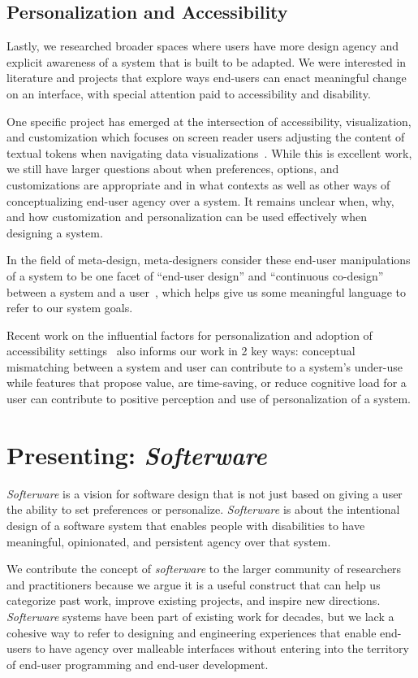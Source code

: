 \documentclass[12pt]{cmuthesis}
\begin{document}
\subsection{Personalization and Accessibility}
Lastly, we researched broader spaces where users have more design agency and explicit awareness of a system that is built to be adapted. We were interested in literature and projects that explore ways end-users can enact meaningful change on an interface, with special attention paid to accessibility and disability.

One specific project has emerged at the intersection of accessibility, visualization, and customization which focuses on screen reader users adjusting the content of textual tokens when navigating data visualizations~\cite{Jones2024}. While this is excellent work, we still have larger questions about when preferences, options, and customizations are appropriate and in what contexts as well as other ways of conceptualizing end-user agency over a system. It remains unclear when, why, and how customization and personalization can be used effectively when designing a system.

In the field of meta-design, meta-designers consider these end-user manipulations of a system to be one facet of ``end-user design'' and ``continuous co-design'' between a system and a user~\cite{Maceli2013}, which helps give us some meaningful language to refer to our system goals.

Recent work on the influential factors for personalization and adoption of accessibility settings~\cite{Wood2023} also informs our work in 2 key ways: conceptual mismatching between a system and user can contribute to a system's under-use while features that propose value, are time-saving, or reduce cognitive load for a user can contribute to positive perception and use of personalization of a system.

\section{Presenting: \textit{Softerware}}

\textit{Softerware} is a vision for software design that is not just based on giving a user the ability to set preferences or personalize. \textit{Softerware} is about the intentional design of a software system that enables people with disabilities to have meaningful, opinionated, and persistent agency over that system.

We contribute the concept of \textit{softerware} to the larger community of researchers and practitioners because we argue it is a useful construct that can help us categorize past work, improve existing projects, and inspire new directions. \textit{Softerware} systems have been part of existing work for decades, but we lack a cohesive way to refer to designing and engineering experiences that enable end-users to have agency over malleable interfaces without entering into the territory of end-user programming and end-user development.
\end{document}
